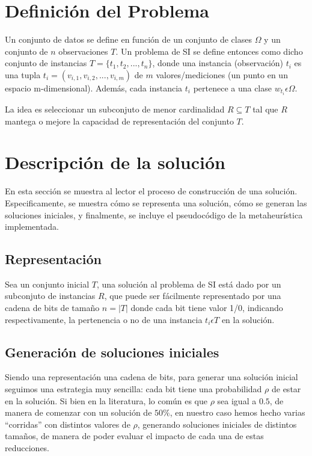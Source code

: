 \documentclass[11pt]{article}
\begin{document}
\section{Definición del Problema}

Un conjunto de datos se define en función de un conjunto de clases $\Omega$ y
un conjunto de $n$ observaciones $T$. Un problema de SI se define entonces como dicho 
conjunto de instancias 
$T = \{t_{1}, t_{2},..., t_{n}\}$, donde una instancia (observación) $t_{i}$ es
una tupla $t_{i} = (v_{i,1}, v_{i,2},...,v_{i,m})$ de $m$ valores/mediciones
(un punto en un espacio m-dimensional). Además, cada instancia $t_{i}$
pertenece a una clase $w_{t_{i}}  \epsilon  \Omega$. 

La idea es seleccionar un subconjuto de menor cardinalidad 
$R \subseteq T$ tal que $R$ mantega o mejore la capacidad 
de representación del conjunto $T$.

\section{Descripción de la solución}

En esta sección se muestra al lector el proceso de construcción de una 
solución. Especificamente, se muestra cómo se representa una solución,
cómo se generan las soluciones iniciales, y finalmente, se incluye 
el pseudocódigo de la metaheurística implementada.

\subsection{Representación}

Sea un conjunto inicial $T$, una solución al problema de SI está
dado por un subconjuto de instancias $R$,
que puede ser fácilmente representado por una cadena de bits de 
tamaño $n = |T|$ donde cada bit tiene valor 1/0, indicando respectivamente,
la pertenencia o no de una instancia $t_{i} \epsilon T$ en la solución. 

\subsection{Generación de soluciones iniciales}

Siendo una representación una cadena de bits, para generar una solución
inicial seguimos una estrategia muy sencilla: cada bit tiene una probabilidad $\rho$
de estar en la solución. Si bien en la literatura, lo común es
que $\rho$ sea igual a $0.5$, de manera de comenzar con un solución
de $50\%$, en nuestro caso hemos hecho varias ``corridas'' con distintos valores
de $\rho$, generando soluciones iniciales de distintos tamaños, de manera de poder
evaluar el impacto de cada una de estas reducciones.
\end{document}
